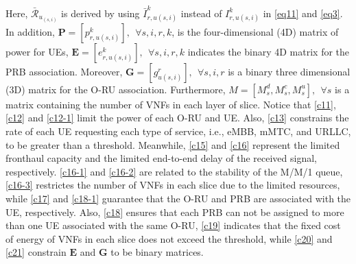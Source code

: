 \documentclass[lettersize,journal]{IEEEtran}
\begin{document}
Here, $\bar{\mathcal{R}}_{u_{(s,i)}}$ is derived by using $\bar{I}_{r,u(s,i)}^{k}$ instead of $I_{r,u(s,i)}^{k}$ in  \eqref{eq11} and \eqref{eq3}.
In addition, $\boldsymbol{P} =[p_{r,u(s,i)}^{k}], \:\: \forall s , i, r, k $, is the four-dimensional (4D) matrix of power for UEs, $\boldsymbol{E} =[e_{r,u(s,i)}^k], \:\: \forall s , i, r, k$ indicates the binary 4D matrix for the PRB association. Moreover, $\boldsymbol{G} =[g_{u(s,i)}^r], \:\: \forall s , i, r$ is a binary three dimensional (3D) matrix for the O-RU association. Furthermore, $M = [M_s^d, M_s^c, M_s^u], \:\: \forall s$ is a matrix containing the number of VNFs in each layer of slice. Notice that 
\eqref{c11}, \eqref{c12} and \eqref{c12-1} limit the power of each O-RU and UE.
Also, \eqref{c13} constrains the rate of each UE requesting each type of service, i.e., eMBB, mMTC, and URLLC, to be greater than a threshold. Meanwhile,
\eqref{c15} and \eqref{c16} represent the limited fronthaul capacity and the limited end-to-end delay of the received signal, respectively.
\eqref{c16-1} and \eqref{c16-2} are related to the stability of the M/M/1 queue,
\eqref{c16-3} restrictes the number of VNFs in each slice due to the limited resources, while
\eqref{c17} and \eqref{c18-1} guarantee that the O-RU and PRB are associated with the UE, respectively.
Also, \eqref{c18} ensures that each PRB can not be assigned to more than one UE associated with the same O-RU, \eqref{c19} indicates that the fixed cost of energy of VNFs in each slice does not exceed the threshold, while \eqref{c20} and \eqref{c21} constrain $\boldsymbol{E}$ and $\boldsymbol{G}$ to be binary matrices.
\vspace{-3mm}
\end{document}
